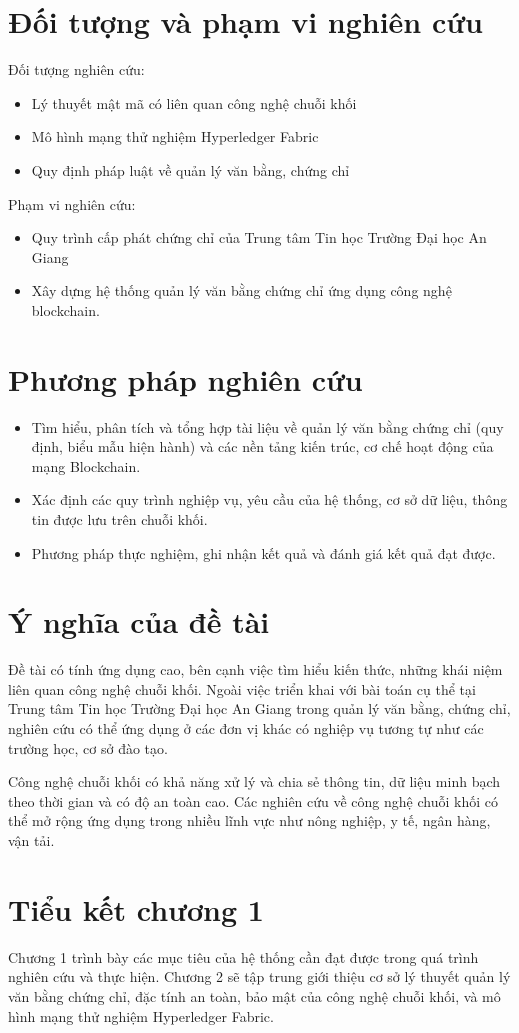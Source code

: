 \section{Đối tượng và phạm vi nghiên cứu}

Đối tượng nghiên cứu:

\begin{itemize}
\item Lý thuyết mật mã có liên quan công nghệ chuỗi khối
\item Mô hình mạng thử nghiệm Hyperledger Fabric
\item Quy định pháp luật về quản lý văn bằng, chứng chỉ
\end{itemize}

Phạm vi nghiên cứu:

\begin{itemize}
\item Quy trình cấp phát chứng chỉ của Trung tâm Tin học Trường Đại học An Giang
\item Xây dựng hệ thống quản lý văn bằng chứng chỉ ứng dụng công nghệ blockchain.
\end{itemize}

\section{Phương pháp nghiên cứu}

\begin{itemize}
\item Tìm hiểu, phân tích và tổng hợp tài liệu về quản lý văn bằng chứng chỉ (quy định, biểu mẫu hiện hành) và các nền tảng kiến trúc, cơ chế hoạt động của mạng Blockchain.
\item Xác định các quy trình nghiệp vụ, yêu cầu của hệ thống, cơ sở dữ liệu, thông tin được lưu trên chuỗi khối.
\item Phương pháp thực nghiệm, ghi nhận kết quả và đánh giá kết quả đạt được.
\end{itemize}
\section{Ý nghĩa của đề tài}

Đề tài có tính ứng dụng cao, bên cạnh việc tìm hiểu kiến thức, những khái niệm liên quan công nghệ chuỗi khối.
Ngoài việc triển khai với bài toán cụ thể tại Trung tâm Tin học Trường Đại học An Giang trong quản lý văn bằng, chứng chỉ, nghiên cứu có thể ứng dụng ở các đơn vị khác có nghiệp vụ tương tự như các trường học, cơ sở đào tạo.

Công nghệ chuỗi khối có khả năng xử lý và chia sẻ thông tin, dữ liệu minh bạch theo thời gian và có độ an toàn cao. Các nghiên cứu về công nghệ chuỗi khối có thể mở rộng ứng dụng trong nhiều lĩnh vực như nông nghiệp, y tế, ngân hàng, vận tải.
\section{Tiểu kết chương 1}

Chương 1 trình bày các mục tiêu của hệ thống cần đạt được trong quá trình nghiên cứu và thực hiện. Chương 2 sẽ tập trung giới thiệu cơ sở lý thuyết quản lý văn bằng chứng chỉ, đặc tính an toàn, bảo mật của công nghệ chuỗi khối, và mô hình mạng thử nghiệm Hyperledger Fabric.
